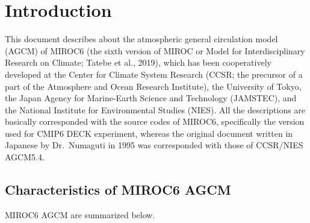 \hypertarget{introduction}{%
\section{Introduction}\label{introduction}}

This document describes about the atmospheric general circulation model
(AGCM) of MIROC6 (the sixth version of MIROC or Model for
Interdisciplinary Research on Climate; Tatebe et al., 2019), which has
been cooperatively developed at the Center for Climate System Research
(CCSR; the precursor of a part of the Atmosphere and Ocean Research
Institute), the University of Tokyo, the Japan Agency for Marine-Earth
Science and Technology (JAMSTEC), and the National Institute for
Environmental Studies (NIES). All the descriptions are basically
corresponded with the source codes of MIROC6, specifically the version
used for CMIP6 DECK experiment, whereas the original document written in
Japanese by Dr.~Numaguti in 1995 was corresponded with those of
CCSR/NIES AGCM5.4.

\hypertarget{characteristics-of-miroc6-agcm}{%
\subsection{Characteristics of MIROC6
AGCM}\label{characteristics-of-miroc6-agcm}}

MIROC6 AGCM are summarized below.

